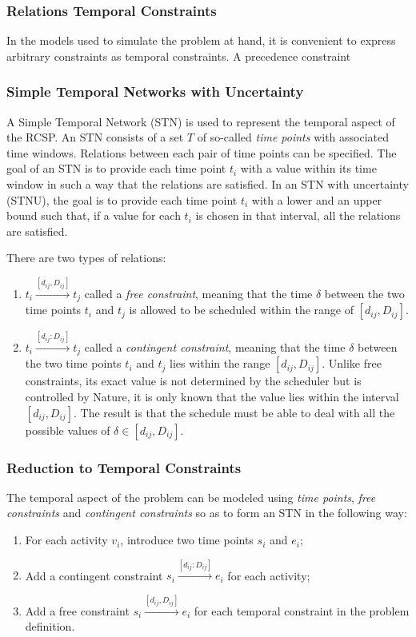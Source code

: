 \documentclass{article}
\begin{document}
\subsubsection{Relations Temporal Constraints}
In the models used to simulate the problem at hand, it is convenient to express arbitrary constraints as temporal constraints. A precedence constraint 


\subsubsection{Simple Temporal Networks with Uncertainty}
A Simple Temporal Network (STN) is used to represent the temporal aspect of the RCSP. An STN consists of a set $T$ of so-called \emph{time points} with associated time windows. Relations between each pair of time points can be specified. The goal of an STN is to provide each time point $t_i$ with a value within its time window in such a way that the relations are satisfied. In an STN with uncertainty (STNU), the goal is to provide each time point $t_i$ with a lower and an upper bound such that, if a value for each $t_i$ is chosen in that interval, all the relations are satisfied.

There are two types of relations:
\begin{enumerate}
\item $t_i \xrightarrow{[d_{ij},D_{ij}]} t_j$ called a \emph{free constraint}, meaning that the time $\delta$ between the two time points $t_i$ and $t_j$ is allowed to be scheduled within the range of $[d_{ij},D_{ij}]$.
\item $t_i \xrightarrow{[d_{ij}:D_{ij}]} t_j$ called a \emph{contingent constraint}, meaning that the time $\delta$ between the two time points $t_i$ and $t_j$ lies within the range $[d_{ij},D_{ij}]$. Unlike free constraints, its exact value is not determined by the scheduler but is controlled by Nature, it is only known that the value lies within the interval $[d_{ij},D_{ij}]$. The result is that the schedule must be able to deal with all the possible values of $\delta \in [d_{ij},D_{ij}]$.
\end{enumerate}

\subsubsection{Reduction to Temporal Constraints}
The temporal aspect of the problem can be modeled using \emph{time points}, \emph{free constraints} and \emph{contingent constraints} so as to form an STN in the following way:
\begin{enumerate}
\item For each activity $v_i$, introduce two time points $s_i$ and $e_i$;
\item Add a contingent constraint $s_i \xrightarrow{[d_{ij}:D_{ij}]} e_i$ for each activity;
\item Add a free constraint $s_i \xrightarrow{[d_{ij},D_{ij}]} e_i$ for each temporal constraint in the problem definition.
\end{enumerate}
\end{document}
